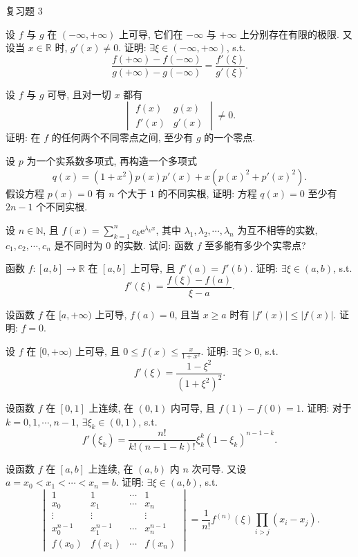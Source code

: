 \begin{exblock}{复习题 3}
    \item 设 $f$ 与 $g$ 在 $(-\infty,+\infty)$ 上可导, 它们在 $-\infty$ 与 $+\infty$ 上分别存在有限的极限. 又设当 $x\in\mathbb{R}$ 时, $g'(x)\neq 0$. 证明: $\exists \xi\in(-\infty,+\infty)$, s.t.
    \[
    \frac{f(+\infty)-f(-\infty)}{g(+\infty)-g(-\infty)}=\frac{f'(\xi)}{g'(\xi)}.
\]

    \item 设 $f$ 与 $g$ 可导, 且对一切 $x$ 都有
    \[
    \begin{vmatrix}
    f(x) & g(x)\\
    f'(x) & g'(x)
\end{vmatrix}\neq 0.
\]
    证明: 在 $f$ 的任何两个不同零点之间, 至少有 $g$ 的一个零点.

    \item 设 $p$ 为一个实系数多项式, 再构造一个多项式
    \[
    q(x)=(1+x^{2})p(x)p'(x)+x(p(x)^{2}+p'(x)^{2}).
\]
    假设方程 $p(x)=0$ 有 $n$ 个大于 $1$ 的不同实根, 证明: 方程 $q(x)=0$ 至少有 $2n-1$ 个不同实根.

    \item 设 $n\in\mathbb{N}$, 且 $f(x)=\sum\limits_{k=1}^{n}c_{k}\mathrm{e}^{\lambda_{k}x}$, 其中 $\lambda_{1},\lambda_{2},\cdots,\lambda_{n}$ 为互不相等的实数, $c_{1},c_{2},\cdots,c_{n}$ 是不同时为 $0$ 的实数. 试问: 函数 $f$ 至多能有多少个实零点?

    \item 函数 $f:[a,b]\to\mathbb{R}$ 在 $[a,b]$ 上可导, 且 $f'(a)=f'(b)$. 证明: $\exists \xi\in(a,b)$, s.t.
    \[
    f'(\xi)=\frac{f(\xi)-f(a)}{\xi-a}.
\]

    \item 设函数 $f$ 在 $[a,+\infty)$ 上可导, $f(a)=0$, 且当 $x\geqslant a$ 时有 $|f'(x)|\leqslant |f(x)|$. 证明: $f=0$.

    \item 设 $f$ 在 $[0,+\infty)$ 上可导, 且 $0\leqslant f(x)\leqslant\frac{x}{1+x^{2}}$. 证明: $\exists \xi>0$, s.t.
    \[
    f'(\xi)=\frac{1-\xi^{2}}{(1+\xi^{2})^{2}}.
\]

    \item 设函数 $f$ 在 $[0,1]$ 上连续, 在 $(0,1)$ 内可导, 且 $f(1)-f(0)=1$. 证明: 对于 $k=0,1,\cdots,n-1$, $\exists \xi_{k}\in(0,1)$, s.t.
    \[
    f'(\xi_{k})=\frac{n!}{k!(n-1-k)!}\xi_{k}^{k}(1-\xi_{k})^{n-1-k}.
\]

    \item 设函数 $f$ 在 $[a,b]$ 上连续, 在 $(a,b)$ 内 $n$ 次可导. 又设 $a=x_{0}<x_{1}<\cdots<x_{n}=b$. 证明: $\exists \xi\in(a,b)$, s.t.
    \[
    \begin{vmatrix}
    1 & 1 & \cdots & 1\\
    x_{0} & x_{1} & \cdots & x_{n}\\
    \vdots & \vdots & & \vdots\\
    x_{0}^{n-1} & x_{1}^{n-1} & \cdots & x_{n}^{n-1}\\
    f(x_{0}) & f(x_{1}) & \cdots & f(x_{n})
\end{vmatrix}=\frac{1}{n!}f^{(n)}(\xi)\prod_{i>j}(x_{i}-x_{j}).
\]


\end{exblock}
